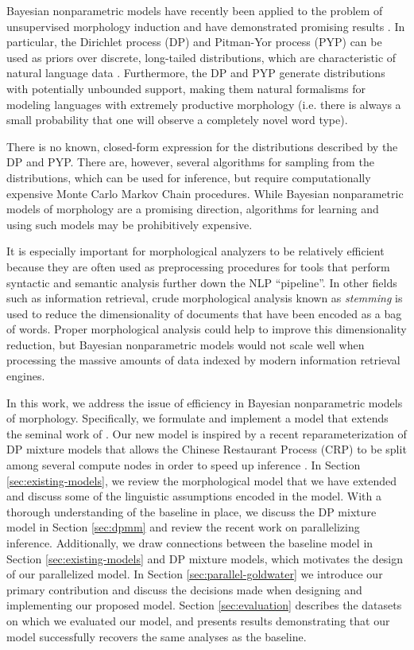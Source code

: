 Bayesian nonparametric models have recently been applied to the
problem of unsupervised morphology induction and have demonstrated
promising results \cite{goldwater2011,dreyer2011,lee2011}. In
particular, the Dirichlet process (DP) and Pitman-Yor process (PYP)
can be used as priors over discrete, long-tailed distributions, which
are characteristic of natural language data
\cite{goldwater2011}. Furthermore, the DP and PYP generate
distributions with potentially unbounded support, making them natural
formalisms for modeling languages with extremely productive morphology
(i.e. there is always a small probability that one will observe a
completely novel word type).

There is no known, closed-form expression for the distributions
described by the DP and PYP. There are, however, several algorithms
for sampling from the distributions, which can be used for inference,
but require computationally expensive Monte Carlo Markov Chain
procedures. While Bayesian nonparametric models of morphology are a
promising direction, algorithms for learning and using such models may
be prohibitively expensive.

It is especially important for morphological analyzers to be
relatively efficient because they are often used as preprocessing
procedures for tools that perform syntactic and semantic analysis
further down the NLP ``pipeline''. In other fields such as information
retrieval, crude morphological analysis known as \textit{stemming} is
used to reduce the dimensionality of documents that have been encoded
as a bag of words. Proper morphological analysis could help to improve
this dimensionality reduction, but Bayesian nonparametric models would
not scale well when processing the massive amounts of data indexed by
modern information retrieval engines.

In this work, we address the issue of efficiency in Bayesian
nonparametric models of morphology. Specifically, we formulate and
implement a model that extends the seminal work of
\cite{goldwater2011}. Our new model is inspired by a recent
reparameterization of DP mixture models that allows the Chinese
Restaurant Process (CRP) to be split among several compute nodes in
order to speed up inference \cite{williamson2013}. In Section
\ref{sec:existing-models}, we review the morphological model that we
have extended and discuss some of the linguistic assumptions encoded
in the model. With a thorough understanding of the baseline in place,
we discuss the DP mixture model in Section \ref{sec:dpmm} and review
the recent work on parallelizing inference. Additionally, we draw
connections between the baseline model in Section
\ref{sec:existing-models} and DP mixture models, which motivates the
design of our parallelized model. In Section
\ref{sec:parallel-goldwater} we introduce our primary contribution and
discuss the decisions made when designing and implementing our
proposed model. Section \ref{sec:evaluation} describes the datasets on
which we evaluated our model, and presents results demonstrating that
our model successfully recovers the same analyses as the baseline.
